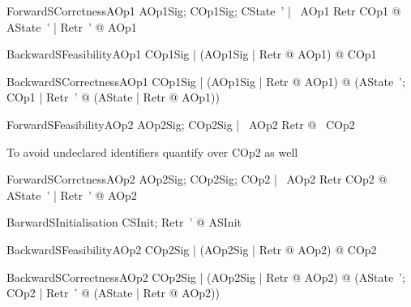 \begin{theorem}{ForwardSCorrctnessAOp1} 
   \forall AOp1Sig; COp1Sig; CState~' | \pre~AOp1 \land Retr \land COp1 @ 
   	\exists AState~' | Retr~' @ AOp1
\end{theorem}

\begin{theorem}{BackwardSFeasibilityAOp1} 
   \forall COp1Sig | (\forall AOp1Sig | Retr @ \pre AOp1) @ \pre COp1
\end{theorem}

\begin{theorem}{BackwardSCorrectnessAOp1} 
  \forall COp1Sig | (\forall AOp1Sig | Retr @ \pre AOp1) @ 
   	(\forall AState~'; COp1 | Retr~' @ (\exists AState | Retr @ AOp1))
\end{theorem}


\begin{theorem}{ForwardSFeasibilityAOp2} 
   \forall AOp2Sig; COp2Sig | \pre~AOp2 \land Retr @ \pre~COp2
\end{theorem}

To avoid undeclared identifiers quantify over COp2 as well
\begin{theorem}{ForwardSCorrctnessAOp2} 
  \forall AOp2Sig; COp2Sig; COp2 | \pre~AOp2 \land Retr \land COp2 @ 
   	\exists AState~' | Retr~' @ AOp2
\end{theorem}

\begin{theorem}{BarwardSInitialisation} 
   \forall CSInit; Retr~' @ ASInit 
\end{theorem}

\begin{theorem}{BackwardSFeasibilityAOp2} 
   \forall COp2Sig | (\forall AOp2Sig | Retr @ \pre AOp2) @ \pre COp2
\end{theorem}

\begin{theorem}{BackwardSCorrectnessAOp2} 
  \forall COp2Sig | (\forall AOp2Sig | Retr @ \pre AOp2) @ 
   	(\forall AState~'; COp2 | Retr~' @ (\exists AState | Retr @ AOp2))
\end{theorem}